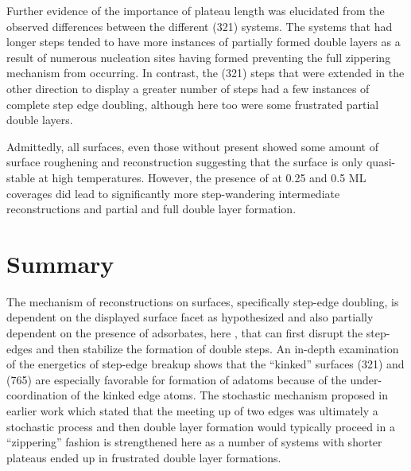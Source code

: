 Further evidence of the importance of plateau length was elucidated from the
observed differences between the different (321) systems. The systems that had
longer steps tended to have more instances of partially formed double layers as
a result of numerous nucleation sites having formed preventing the full
zippering mechanism from occurring. In contrast, the (321) steps that were
extended in the other direction to display a greater number of steps had a few
instances of complete step edge doubling, although here too were some
frustrated partial double layers.

Admittedly, all surfaces, even those without  present showed some amount
of surface roughening and reconstruction suggesting that the surface is only
quasi-stable at high temperatures. However, the presence of  at 0.25 and
0.5 ML coverages did lead to significantly more step-wandering intermediate
reconstructions and partial and full double layer formation.


\section{Summary}
The mechanism of reconstructions on  surfaces, specifically step-edge
doubling, is dependent on the displayed surface facet as hypothesized and also
partially dependent on the presence of adsorbates, here , that can first
disrupt the step-edges and then stabilize the formation of double steps. An in-depth
examination of the energetics of step-edge breakup shows that the ``kinked''
surfaces (321) and (765) are especially favorable for formation of adatoms
because of the under-coordination of the kinked edge atoms. The stochastic
mechanism proposed in earlier work which stated that the meeting up of two
edges was ultimately a stochastic process and then double layer formation would
typically proceed in a ``zippering'' fashion is strengthened here as a number of
systems with shorter plateaus ended up in frustrated double layer formations.

